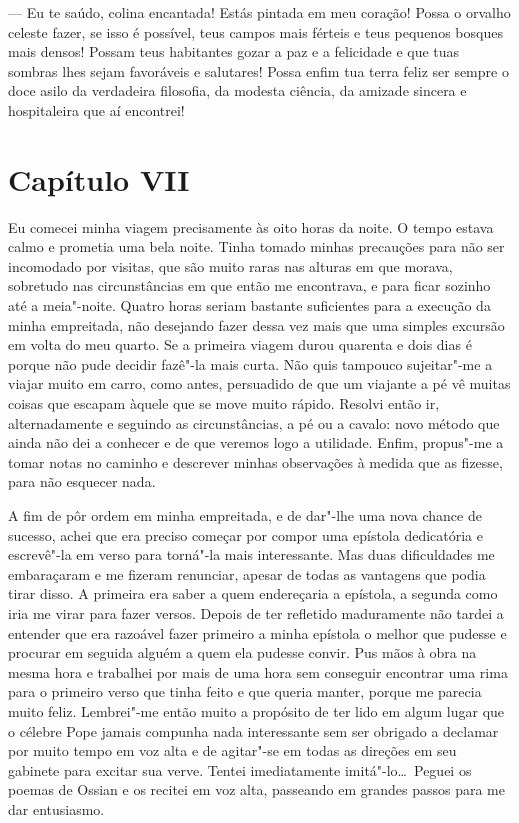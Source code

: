 --- Eu te saúdo, colina encantada! Estás pintada em meu coração! Possa o
orvalho celeste fazer, se isso é possível, teus campos mais férteis e
teus pequenos bosques mais densos! Possam teus habitantes gozar a paz e
a felicidade e que tuas sombras lhes sejam favoráveis e salutares!
Possa enfim tua terra feliz ser sempre o doce asilo da verdadeira
filosofia, da modesta ciência, da amizade sincera e hospitaleira que aí
encontrei!

\section*{Capítulo VII}

 Eu comecei minha viagem precisamente às oito horas da noite. O tempo
estava calmo e prometia uma bela noite. Tinha tomado minhas precauções
para não ser incomodado por visitas, que são muito raras nas alturas em
que morava, sobretudo nas circunstâncias em que então me encontrava, e
para ficar sozinho até a meia"-noite. Quatro horas seriam bastante
suficientes para a execução da minha empreitada, não desejando fazer
dessa vez mais que uma simples excursão em volta do meu quarto. Se a
primeira viagem durou quarenta e dois dias é porque não pude decidir
fazê"-la mais curta. Não quis tampouco sujeitar"-me a viajar muito em
carro, como antes, persuadido de que um viajante a pé vê muitas coisas
que escapam àquele que se move muito rápido. Resolvi então ir,
alternadamente e seguindo as circunstâncias, a pé ou a cavalo: novo
método que ainda não dei a conhecer e de que veremos logo a utilidade.
Enfim, propus"-me a tomar notas no caminho e descrever minhas
observações à medida que as fizesse, para não esquecer nada.

 A fim de pôr ordem em minha empreitada, e de dar"-lhe uma nova chance de
sucesso, achei que era preciso começar por compor uma epístola
dedicatória e escrevê"-la em verso para torná"-la mais interessante. Mas
duas dificuldades me embaraçaram e me fizeram renunciar, apesar de
todas as vantagens que podia tirar disso. A primeira era saber a quem
endereçaria a epístola, a segunda como iria me virar para fazer versos.
Depois de ter refletido maduramente não tardei a entender que era
razoável fazer primeiro a minha epístola o melhor que pudesse e
procurar em seguida alguém a quem ela pudesse convir. Pus mãos à obra
na mesma hora e trabalhei por mais de uma hora sem conseguir encontrar
uma rima para o primeiro verso que tinha feito e que queria manter,
porque me parecia muito feliz. Lembrei"-me então muito a propósito de
ter lido em algum lugar que o célebre Pope jamais compunha nada
interessante sem ser obrigado a declamar por muito tempo em voz alta e
de agitar"-se em todas as direções em seu gabinete para excitar sua
verve. Tentei imediatamente imitá"-lo\ldots\ Peguei os poemas de Ossian e os
recitei em voz alta, passeando em grandes passos para me dar
entusiasmo. 


